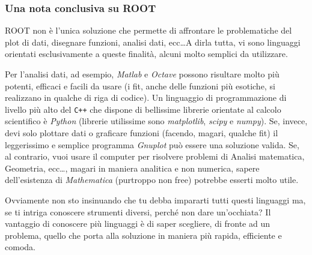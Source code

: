 \subsubsection{Una nota conclusiva su ROOT}
ROOT non è l'unica soluzione che permette di affrontare le problematiche del plot di dati, disegnare funzioni, analisi dati, ecc\ldots A dirla tutta, vi sono linguaggi orientati esclusivamente a queste finalità, alcuni molto semplici da utilizzare. 

Per l'analisi dati, ad esempio, \emph{Matlab} e  \emph{Octave} possono risultare molto più potenti, efficaci e facili da usare (i fit, anche delle funzioni più esotiche, si realizzano in qualche di riga di codice). Un linguaggio di programmazione di livello più alto del \verb|C++| che dispone di bellissime librerie orientate al calcolo scientifico è \emph{Python} (librerie utilissime sono \emph{matplotlib}, \emph{scipy} e \emph{numpy}). Se, invece, devi solo plottare dati o graficare funzioni (facendo, magari, qualche fit) il leggerissimo e semplice programma \emph{Gnuplot} può essere una soluzione valida. Se, al contrario, vuoi usare il computer per risolvere problemi di Analisi matematica, Geometria, ecc\ldots, magari in maniera analitica e non numerica, sapere dell'esistenza di \emph{Mathematica} (purtroppo non free) potrebbe esserti molto utile.

Ovviamente non sto insinuando che tu debba impararti tutti questi linguaggi ma, se ti intriga conoscere strumenti diversi, perché non dare un'occhiata? Il vantaggio di conoscere più linguaggi è di saper scegliere, di fronte ad un problema, quello che porta alla soluzione in maniera più rapida, efficiente e comoda. 